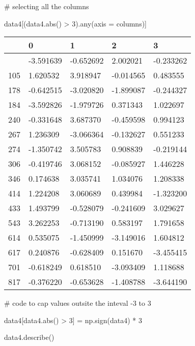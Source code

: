 \documentclass[
  letterpaper,
  DIV=11,
  numbers=noendperiod]{scrreprt}
\newenvironment{Shaded}{\begin{snugshade}}{\end{snugshade}}
\newcommand{\BuiltInTok}[1]{\textcolor[rgb]{0.00,0.23,0.31}{#1}}
\newcommand{\CommentTok}[1]{\textcolor[rgb]{0.37,0.37,0.37}{#1}}
\newcommand{\DecValTok}[1]{\textcolor[rgb]{0.68,0.00,0.00}{#1}}
\newcommand{\NormalTok}[1]{\textcolor[rgb]{0.00,0.23,0.31}{#1}}
\newcommand{\OperatorTok}[1]{\textcolor[rgb]{0.37,0.37,0.37}{#1}}
\newcommand{\StringTok}[1]{\textcolor[rgb]{0.13,0.47,0.30}{#1}}
\begin{document}
\begin{Shaded}
\begin{Highlighting}[]
\CommentTok{\# selecting all the columns}

\NormalTok{data4[(data4.}\BuiltInTok{abs}\NormalTok{() }\OperatorTok{\textgreater{}} \DecValTok{3}\NormalTok{).}\BuiltInTok{any}\NormalTok{(axis }\OperatorTok{=} \StringTok{\textquotesingle{}columns\textquotesingle{}}\NormalTok{)]}
\end{Highlighting}
\end{Shaded}

\begin{longtable}[]{@{}lllll@{}}
\toprule\noalign{}
& 0 & 1 & 2 & 3 \\
\midrule\noalign{}
\endhead
\bottomrule\noalign{}
\endlastfoot
78 & -3.591639 & -0.652692 & 2.002021 & -0.233262 \\
105 & 1.620532 & 3.918947 & -0.014565 & 0.483555 \\
178 & -0.642515 & -3.020820 & -1.899087 & -0.244327 \\
184 & -3.592826 & -1.979726 & 0.371343 & 1.022697 \\
240 & -0.331648 & 3.687370 & -0.459598 & 0.994123 \\
267 & 1.236309 & -3.066364 & -0.132627 & 0.551233 \\
274 & -1.350742 & 3.505783 & 0.908839 & -0.219144 \\
306 & -0.419746 & 3.068152 & -0.085927 & 1.446228 \\
346 & 0.174638 & 3.035741 & 1.034076 & 1.208338 \\
414 & 1.224208 & 3.060689 & 0.439984 & -1.323200 \\
433 & 1.493799 & -0.528079 & -0.241609 & 3.029627 \\
543 & 3.262253 & -0.713190 & 0.583197 & 1.791658 \\
614 & 0.535075 & -1.450999 & -3.149016 & 1.604812 \\
617 & 0.240876 & -0.628409 & 0.151670 & -3.455415 \\
701 & -0.618249 & 0.618510 & -3.093409 & 1.118688 \\
817 & -0.376220 & -0.653628 & -1.408788 & -3.644190 \\
\end{longtable}

\begin{Shaded}
\begin{Highlighting}[]
\CommentTok{\# code to cap values outsite the inteval {-}3 to 3}

\NormalTok{data4[data4.}\BuiltInTok{abs}\NormalTok{() }\OperatorTok{\textgreater{}} \DecValTok{3}\NormalTok{] }\OperatorTok{=}\NormalTok{ np.sign(data4) }\OperatorTok{*} \DecValTok{3}

\NormalTok{data4.describe()}
\end{Highlighting}
\end{Shaded}
\end{document}
